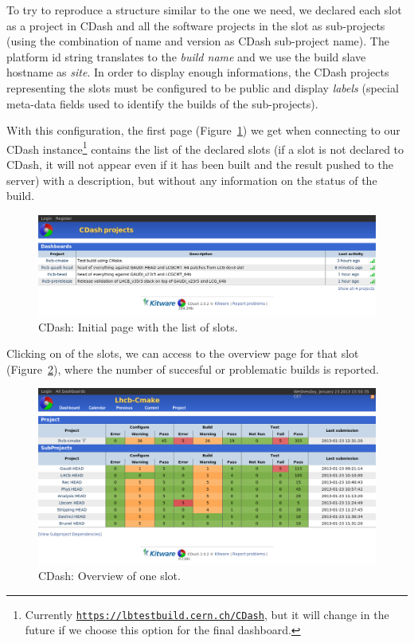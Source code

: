\documentclass{lhcbnote}
\newcommand{\link}[2]{\href{#1}{#2}}
\newcommand{\urlLink}[1]{\link{#1}{\texttt{#1}}}
\begin{document}
To try to reproduce a structure similar to the one we need, we declared each
slot as a project in CDash and all the software projects in the slot as
sub-projects\cite{CMakeBook,CDashSubprojects} (using the combination of name and
version as CDash sub-project name).  The platform id string translates to the
\emph{build name} and we use the build slave hostname as \emph{site}.  In order
to display enough informations, the CDash projects representing the slots must
be configured to be public and display \emph{labels} (special meta-data fields
used to identify the builds of the sub-projects).

With this configuration, the first page (Figure~\ref{fig:cdash-home}) we get
when connecting to our CDash instance\footnote{Currently
\urlLink{https://lbtestbuild.cern.ch/CDash}, but it will change in the future if
we choose this option for the final dashboard.} contains the list of the
declared slots (if a slot is not declared to CDash, it will not appear even if
it has been built and the result pushed to the server) with a description, but
without any information on the status of the build.

\begin{figure}
  \begin{center}
    \includegraphics[width=15cm]{images/cdash-1}
  \end{center}
  \caption{CDash: Initial page with the list of slots.}
  \label{fig:cdash-home}
\end{figure}

Clicking on of the slots, we can access to the overview page for that slot
(Figure~\ref{fig:cdash-slot}), where the number of succesful or problematic
builds is reported.

\begin{figure}
  \begin{center}
    \includegraphics[width=15cm]{images/cdash-2}
  \end{center}
  \caption{CDash: Overview of one slot.}
  \label{fig:cdash-slot}
\end{figure}
\end{document}
